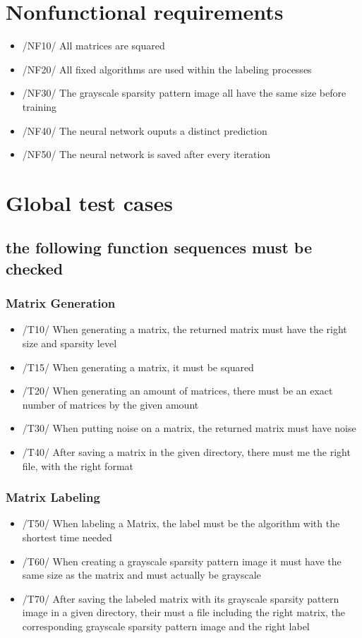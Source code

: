 \documentclass[parskip=full]{scrartcl}
\begin{document}
\section{Nonfunctional requirements}
	\begin{itemize}
		\item /NF10/ All matrices are squared
		\item /NF20/ All fixed \glspl{algorithm} are used within the labeling processes
		\item /NF30/ The \gls{grayscale sparsity pattern image} all have the same size before training
		\item /NF40/ The \gls{neural network} ouputs a distinct prediction
		\item /NF50/ The \gls{neural network} is saved after every iteration
	\end{itemize}
	

\section{Global test cases}
\subsection{the following function sequences must be checked}
\subsubsection{Matrix Generation}
	\begin{itemize}
		\item /T10/ When generating a matrix, the returned matrix must have the right size and sparsity level
		\item /T15/ When generating a matrix, it must be squared
		\item /T20/ When generating an amount of matrices, there must be an exact number of matrices by the given amount
		\item /T30/ When putting noise on a matrix, the returned matrix must have noise
		\item /T40/ After saving a matrix in the given directory, there must me the right file, with the right format
	\end{itemize}

\subsubsection{Matrix Labeling}
		\begin{itemize}
		\item /T50/ When labeling a Matrix, the label must be the \gls{algorithm} with the shortest time needed
		\item /T60/ When creating a \gls{grayscale sparsity pattern image} it must have the same size as
                       the matrix and must actually be grayscale
		\item /T70/ After saving the labeled matrix with its \gls{grayscale sparsity pattern image} in a given directory, their must a file including the right matrix, the corresponding \gls{grayscale sparsity pattern image} and the right label
		\end{itemize}
\end{document}
